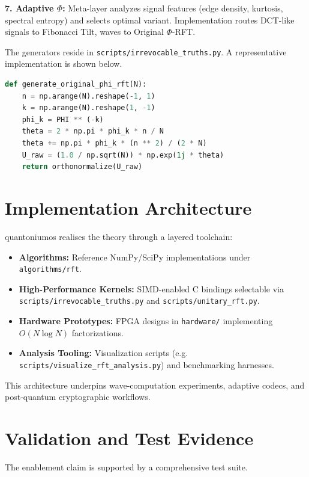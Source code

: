 \documentclass[11pt,a4paper]{article}
\begin{document}
\textbf{7. Adaptive $\Phi$:} Meta-layer analyzes signal features (edge density, kurtosis, spectral entropy) and selects optimal variant. Implementation routes DCT-like signals to Fibonacci Tilt, waves to Original $\Phi$-RFT.

\noindent The generators reside in \texttt{scripts/irrevocable\_truths.py}. A representative implementation is shown below.

\begin{lstlisting}[language=Python,caption={Original $\Phi$-RFT generator},label={lst:generator}]
def generate_original_phi_rft(N):
    n = np.arange(N).reshape(-1, 1)
    k = np.arange(N).reshape(1, -1)
    phi_k = PHI ** (-k)
    theta = 2 * np.pi * phi_k * n / N
    theta += np.pi * phi_k * (n ** 2) / (2 * N)
    U_raw = (1.0 / np.sqrt(N)) * np.exp(1j * theta)
    return orthonormalize(U_raw)
\end{lstlisting}

\section{Implementation Architecture}

quantoniumos realises the theory through a layered toolchain:

\begin{itemize}
    \item \textbf{Algorithms:} Reference NumPy/SciPy implementations under \texttt{algorithms/rft}.
    \item \textbf{High-Performance Kernels:} SIMD-enabled C bindings selectable via \texttt{scripts/irrevocable\_truths.py} and \texttt{scripts/unitary\_rft.py}.
    \item \textbf{Hardware Prototypes:} FPGA designs in \texttt{hardware/} implementing $O(N \log N)$ factorizations.
    \item \textbf{Analysis Tooling:} Visualization scripts (e.g. \texttt{scripts/visualize\_rft\_analysis.py}) and benchmarking harnesses.
\end{itemize}

This architecture underpins wave-computation experiments, adaptive codecs, and post-quantum cryptographic workflows.

\section{Validation and Test Evidence}

The enablement claim is supported by a comprehensive test suite.
\end{document}
